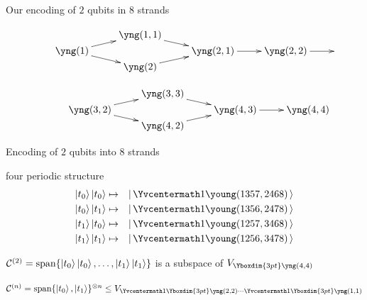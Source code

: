 \documentclass{prosper}
\renewcommand{\>}{\rangle}
\newcommand{\<}{\langle}
\begin{document}

\begin{slide}{Our encoding of $2$ qubits in $8$ strands}

\[
\!\!\!\!
\xymatrix@R=.01cm{
                 &                           & {\yng(1,1)} \ar[rd] \\
 & {\yng(1)} \ar[ur] \ar[dr] &                     &
	  {\yng(2,1)} \ar[r] & {\yng(2,2)} \ar[r] &  \\
& & {\yng(2)} \ar[ru]
}
\]

\[
\xymatrix@R=.01cm{
                 &                           & {\yng(3,3)} \ar[rd] \\
 & {\yng(3,2)} \ar[ur] \ar[dr] &                     & {\yng(4,3)} \ar[r] & {\yng(4,4)} \\
& & {\yng(4,2)} \ar[ru]
}
\]

\end{slide}


\begin{slide}{Encoding of $2$ qubits into $8$ strands}

four periodic structure
\vspace{-0.5cm}
\begin{eqnarray*}
\ket{t_0}\ket{t_0} &\mapsto&
  \ket{\,\Yvcentermath1 \young(1357,2468)\,} \\
\ket{t_0}\ket{t_1} &\mapsto&
  \ket{\,\Yvcentermath1 \young(1356,2478)\,} \\
\ket{t_1}\ket{t_0} &\mapsto&
  \ket{\,\Yvcentermath1 \young(1257,3468)\,} \\
\ket{t_1}\ket{t_1} &\mapsto&
  \ket{\,\Yvcentermath1 \young(1256,3478)\,}
\end{eqnarray*}

\medskip
${\cal
C}^{(2)}=\text{span}\{\left\vert{t_0}\right\rangle\left\vert{t_0}\right\rangle,\ldots,\left\vert{t_1}\right\rangle\left\vert{t_1}\right\rangle\}$
is a subspace of $V_{\Yboxdim{3pt}\yng(4,4)}$ 

\medskip
${\cal C}^{(n)}=\text{span}\{\ket{t_0},\ket{t_1}\}^{\otimes n} \le 
V_{\Yvcentermath1\Yboxdim{3pt}\yng(2,2) \cdots \Yvcentermath1\Yboxdim{3pt}\yng(1,1)}$

\end{slide}

\end{document}
